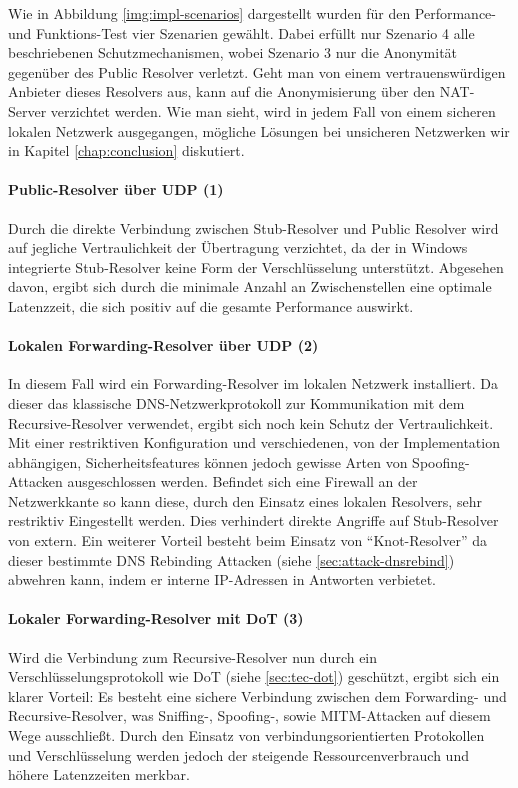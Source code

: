 Wie in Abbildung \ref{img:impl-scenarios} dargestellt wurden für den Performance- und Funktions-Test vier Szenarien gewählt. Dabei erfüllt nur Szenario 4 alle beschriebenen Schutzmechanismen, wobei Szenario 3 nur die Anonymität gegenüber des Public Resolver verletzt. Geht man von einem vertrauenswürdigen Anbieter dieses Resolvers aus, kann auf die Anonymisierung über den NAT-Server verzichtet werden. Wie man sieht, wird in jedem Fall von einem sicheren lokalen Netzwerk ausgegangen, mögliche Lösungen bei unsicheren Netzwerken wir in Kapitel \ref{chap:conclusion} diskutiert. 

\paragraph{Public-Resolver über UDP (1)}
Durch die direkte Verbindung zwischen Stub-Resolver und Public Resolver wird auf jegliche Vertraulichkeit der Übertragung verzichtet, da der in Windows integrierte Stub-Resolver keine Form der Verschlüsselung unterstützt. Abgesehen davon, ergibt sich durch die minimale Anzahl an Zwischenstellen eine optimale Latenzzeit, die sich positiv auf die gesamte Performance auswirkt.

\paragraph{Lokalen Forwarding-Resolver über UDP (2)}
In diesem Fall wird ein Forwarding-Resolver im lokalen Netzwerk installiert. Da dieser das klassische DNS-Netzwerkprotokoll zur Kommunikation mit dem Recursive-Resolver verwendet, ergibt sich noch kein Schutz der Vertraulichkeit. Mit einer restriktiven Konfiguration und verschiedenen, von der Implementation abhängigen, Sicherheitsfeatures können jedoch gewisse Arten von Spoofing-Attacken ausgeschlossen werden. Befindet sich eine Firewall an der Netzwerkkante so kann diese, durch den Einsatz eines lokalen Resolvers, sehr restriktiv Eingestellt werden. Dies verhindert direkte Angriffe auf Stub-Resolver von extern. Ein weiterer Vorteil besteht beim Einsatz von ``Knot-Resolver'' da dieser bestimmte DNS Rebinding Attacken (siehe \ref{sec:attack-dnsrebind}) abwehren kann, indem er interne IP-Adressen in Antworten verbietet\cite{KnotResolverDocRebinding}.

\paragraph{Lokaler Forwarding-Resolver mit DoT (3)}
Wird die Verbindung zum Recursive-Resolver nun durch ein Verschlüsselungsprotokoll wie DoT (siehe \ref{sec:tec-dot}) geschützt, ergibt sich ein klarer Vorteil: Es besteht eine sichere Verbindung zwischen dem Forwarding- und Recursive-Resolver, was Sniffing-, Spoofing-, sowie MITM-Attacken auf diesem Wege ausschließt. Durch den Einsatz von verbindungsorientierten Protokollen und Verschlüsselung werden jedoch der steigende Ressourcenverbrauch und höhere Latenzzeiten merkbar.


